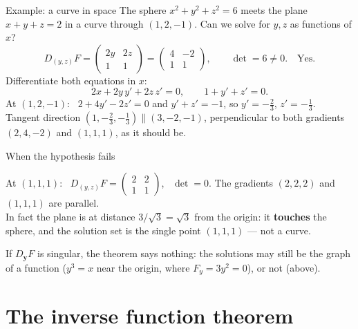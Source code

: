 \documentclass[10pt]{wosm-slides}
\newcommand{\vy}{\mathbf{y}}
\begin{document}
\begin{frame}{Example: a curve in space}
  The sphere $x^2 + y^2 + z^2 = 6$ meets the plane $x + y + z = 2$ in a curve through $(1, 2, -1)$.
  Can we solve for $y, z$ as functions of $x$?
  \pause
  \[ D_{(y, z)}F = \begin{pmatrix} 2y & 2z \\ 1 & 1 \end{pmatrix} = \begin{pmatrix} 4 & -2 \\ 1 & 1 \end{pmatrix},
     \qquad \det = 6 \ne 0 . \quad \text{Yes.} \]
  \pause
  Differentiate both equations in $x$:
  \[ 2x + 2y\, y' + 2z\, z' = 0, \qquad 1 + y' + z' = 0 . \]
  At $(1, 2, -1)$: \ $2 + 4y' - 2z' = 0$ and $y' + z' = -1$, so $y' = -\frac23$, $z' = -\frac13$.
  \pause
  \\[0.4em] Tangent direction $(1, -\frac23, -\frac13) \parallel (3, -2, -1)$, perpendicular to both
  gradients $(2, 4, -2)$ and $(1, 1, 1)$, as it should be.
\end{frame}

\begin{frame}{When the hypothesis fails}
  \begin{example}[The sphere $x^2 + y^2 + z^2 = 3$ and the plane $x + y + z = 3$]
    At $(1, 1, 1)$: \ $D_{(y, z)}F = \begin{pmatrix} 2 & 2 \\ 1 & 1 \end{pmatrix}$, \ $\det = 0$. The
    gradients $(2, 2, 2)$ and $(1, 1, 1)$ are parallel.
    \pause\\[0.3em]
    In fact the plane is at distance $3/\sqrt3 = \sqrt3$ from the origin: it \textbf{touches} the sphere,
    and the solution set is the single point $(1, 1, 1)$ --- not a curve.
  \end{example}
  \pause
  \begin{warning}
    If $D_{\vy}F$ is singular, the theorem says nothing: the solutions may still be the graph of a
    function ($y^3 = x$ near the origin, where $F_y = 3y^2 = 0$), or not (above).
  \end{warning}
\end{frame}

\section{The inverse function theorem}
\end{document}
